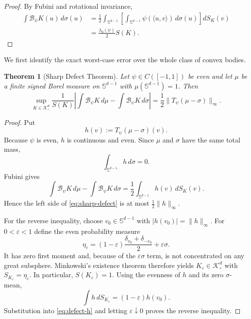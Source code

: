 \documentclass[12pt,a4paper]{article}
\newcommand{\Sph}{\mathbb S}
\newcommand{\K}{\mathcal K}
\newcommand{\cB}{\mathcal B}
\theoremstyle{plain}
\newtheorem{theorem}{Theorem}[section]
\theoremstyle{definition}
\begin{document}
\begin{proof}
By Fubini and rotational invariance,
\[
 \begin{aligned}
 \int \cB_\psi K(u)\,d\sigma(u)
 &=\frac12\int_{\Sph^{d-1}}
 \left[\int_{\Sph^{d-1}}\psi(\langle u,v\rangle)\,d\sigma(u)\right]dS_K(v)\\
 &=\frac{\lambda_0(\psi)}2S(K).
 \end{aligned}
\]
\end{proof}

We first identify the exact worst-case error over the whole class of convex bodies.

\begin{theorem}[Sharp Defect Theorem]\label{thm:sharp-defect}
Let $\psi\in C([-1,1])$ be even and let $\mu$ be a finite signed Borel measure on $\Sph^{d-1}$ with $\mu(\Sph^{d-1})=1$. Then
\begin{equation}\label{eq:sharp-defect}
 \boxed{
 \sup_{K\in\K^d_\circ}
 \frac{1}{S(K)}
 \left|\int\cB_\psi K\,d\mu-\int\cB_\psi K\,d\sigma\right|
 =\frac12\|T_\psi(\mu-\sigma)\|_\infty .
 }
\end{equation}
\end{theorem}

\begin{proof}
Put
\[
 h(v):=T_\psi(\mu-\sigma)(v).
\]
Because $\psi$ is even, $h$ is continuous and even. Since $\mu$ and $\sigma$ have the same total mass,
\[
 \int_{\Sph^{d-1}}h\,d\sigma=0.
\]
Fubini gives
\begin{equation}\label{eq:defect-h}
 \int\cB_\psi K\,d\mu-\int\cB_\psi K\,d\sigma
 =\frac12\int_{\Sph^{d-1}}h(v)\,dS_K(v).
\end{equation}
Hence the left side of \eqref{eq:sharp-defect} is at most $\frac12\|h\|_\infty$.

For the reverse inequality, choose $v_0\in\Sph^{d-1}$ with $|h(v_0)|=\|h\|_\infty$. For $0<\varepsilon<1$ define the even probability measure
\[
 \eta_\varepsilon
 =(1-\varepsilon)\frac{\delta_{v_0}+\delta_{-v_0}}2+\varepsilon\sigma.
\]
It has zero first moment and, because of the $\varepsilon\sigma$ term, is not concentrated on any great subsphere. Minkowski's existence theorem therefore yields $K_\varepsilon\in\K^d_\circ$ with $S_{K_\varepsilon}=\eta_\varepsilon$. In particular, $S(K_\varepsilon)=1$. Using the evenness of $h$ and its zero $\sigma$-mean,
\[
 \int h\,dS_{K_\varepsilon}
 =(1-\varepsilon)h(v_0).
\]
Substitution into \eqref{eq:defect-h} and letting $\varepsilon\downarrow0$ proves the reverse inequality.
\end{proof}
\end{document}
